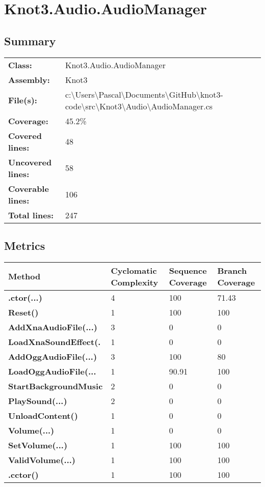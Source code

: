 \documentclass[a4paper,10pt]{article}
\begin{document}
\section{Knot3.Audio.AudioManager}
\subsection{Summary}
\begin{longtable}[l]{ll}
\textbf{Class:} & Knot3.Audio.AudioManager\\
\textbf{Assembly:} & Knot3\\
\textbf{File(s):} & \begin{minipage}[t]{12cm}{c:\textbackslash Users\textbackslash Pascal\textbackslash Documents\textbackslash GitHub\textbackslash knot3-code\textbackslash src\textbackslash Knot3\textbackslash Audio\textbackslash AudioManager.cs}\end{minipage} \\
\textbf{Coverage:} & 45.2\%\\
\textbf{Covered lines:} & 48\\
\textbf{Uncovered lines:} & 58\\
\textbf{Coverable lines:} & 106\\
\textbf{Total lines:} & 247\\
\end{longtable}
\subsection{Metrics}
\begin{longtable}[l]{|l|l|l|l|}
\hline
\textbf{Method} & \textbf{Cyclomatic Complexity} & \textbf{Sequence Coverage} & \textbf{Branch Coverage}\\
\hline
\textbf{.ctor(...)} & 4 & 100 & 71.43\\
\hline
\textbf{Reset()} & 1 & 100 & 100\\
\hline
\textbf{AddXnaAudioFile(...)} & 3 & 0 & 0\\
\hline
\textbf{LoadXnaSoundEffect(.} & 1 & 0 & 0\\
\hline
\textbf{AddOggAudioFile(...)} & 3 & 100 & 80\\
\hline
\textbf{LoadOggAudioFile(...} & 1 & 90.91 & 100\\
\hline
\textbf{StartBackgroundMusic} & 2 & 0 & 0\\
\hline
\textbf{PlaySound(...)} & 2 & 0 & 0\\
\hline
\textbf{UnloadContent()} & 1 & 0 & 0\\
\hline
\textbf{Volume(...)} & 1 & 0 & 0\\
\hline
\textbf{SetVolume(...)} & 1 & 100 & 100\\
\hline
\textbf{ValidVolume(...)} & 1 & 100 & 100\\
\hline
\textbf{.cctor()} & 1 & 100 & 100\\
\hline
\end{longtable}
\end{document}

